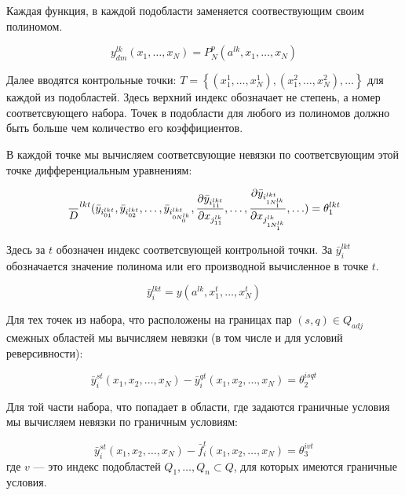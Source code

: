 \documentclass[a4paper,12pt]{article}
\begin{document}
  Каждая функция, в каждой подобласти заменяется соотвествующим своим
  полиномом.

  \begin{equation}
    y_{dm}^{lk}(x_1,\ldots,x_N) = P_N^p(a^{lk},x_1,\ldots,x_N)
  \end{equation}

  Далее вводятся контрольные точки:
  $T=\left\{(x_1^1,\ldots,x_N^1),(x_1^2,\ldots,x_N^2),\ldots\right\}$
  для каждой из подобластей. Здесь верхний индекс обозначает не
  степень, а номер соответсвующего набора. Точек в подобласти для
  любого из полиномов должно быть больше чем количество его
  коэффициентов.

  В каждой точке мы вычисляем соответсвующие невязки по соответсвующим
  этой точке дифференциальным уравнениям:

  \begin{equation}
    \label{res:eq}
    {\over D}^{lkt} ( {\bar y}_{i^{lkt}_{01}}, {\bar y}_{i^{lkt}_{02}},
      \ldots, {\bar y}_{i^{lkt}_{0N^{lk}_0}},\frac{\partial {\bar
          y}_{i^{lkt}_{11}}}{\partial
        x_{j^{lk}_{11}}},\ldots,\frac{\partial {\bar
          y}_{i^{lkt}_{1N^{lk}_1}}}{\partial
        x_{j^{lk}_{1N^{lk}_1}}},\ldots) = \theta^{lkt}_1
  \end{equation}

  Здесь за $t$ обозначен индекс соответсвующей контрольной точки. За
  ${\bar y}_{i}^{lkt}$ обозначается значение полинома или его
  производной вычисленное в точке $t$.

  \begin{equation*}
    {\bar y}_i^{lkt} = y(a^{lk},x^t_1,\ldots, x^t_N)
  \end{equation*}
  
  Для тех точек из набора, что расположены на границах пар $(s,q) \in Q_{adj}$ смежных
  областей мы вычисляем невязки (в том числе и для условий реверсивности):
  
  \begin{equation}
    \label{res:adj}
    {\bar y}_i^{st}\left(x_1,x_2,\ldots,x_N\right) -
    {\bar y}_i^{qt}\left(x_1,x_2,\ldots,x_N\right) = \theta^{isqt}_2
  \end{equation}

  Для той части набора, что попадает в области, где задаются граничные
  условия мы вычисляем невязки по граничным условиям: 

  \begin{equation}
    \label{res:bnd}
    {\bar y}_i^{st}\left(x_1,x_2,\ldots,x_N\right) -
    {\bar f}_i^{t}\left(x_1,x_2,\ldots,x_N\right) = \theta^{ivt}_3
  \end{equation}
  где $v$ --- это индекс подобластей $Q_1,\ldots,Q_n \subset Q$, для
  которых имеются граничные условия.
\end{document}
